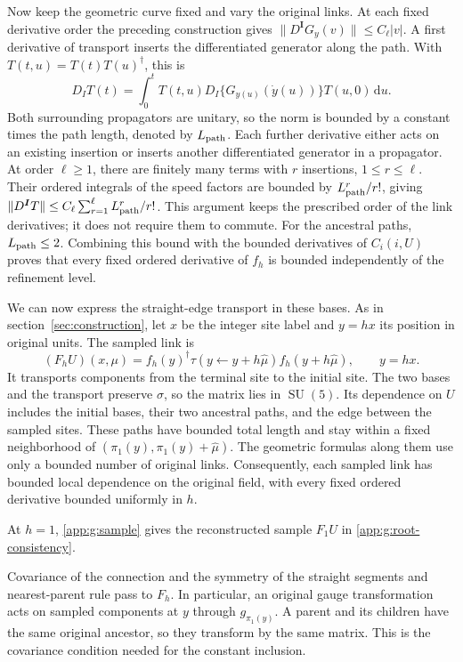 \documentclass[11pt,a4paper]{article}
\theoremstyle{remark}
\DeclareMathOperator{\SU}{SU}
\newcommand{\dd}{\mathrm d}
\begin{document}
Now keep the geometric curve fixed and vary the original links. At each
fixed derivative order the preceding construction gives
$\|D^{\boldsymbol I}G_y(v)\|\le C_\ell|v|$. A first derivative
of transport inserts the differentiated generator along the path. With
$T(t,u)=T(t)T(u)^\dagger$, this is
\begin{equation}
 D_I T(t)=\int_0^t T(t,u)
       D_I\{G_{y(u)}(\dot y(u))\}T(u,0)\,\dd u .
\end{equation}
Both surrounding propagators are unitary, so the norm is bounded by a
constant times the path length, denoted by $L_{\rm path}$. Each further derivative either acts on
an existing insertion or inserts another differentiated generator in a
propagator. At order $\ell\ge1$, there are finitely many terms with
$r$ insertions, $1\le r\le\ell$. Their ordered integrals of
the speed factors are bounded by $L_{\rm path}^r/r!$, giving
$\|D^{\boldsymbol I}T\|\le
C_\ell\sum_{r=1}^{\ell}L_{\rm path}^r/r!$.
This argument keeps the prescribed order of the link derivatives; it
does not require them to commute. For the ancestral paths,
$L_{\rm path}\le2$. Combining this bound with the bounded
derivatives of $C_i(i,U)$ proves that every fixed ordered derivative
of $f_h$ is bounded independently of the refinement level.

We can now express the straight-edge transport in these bases. As in
section~\ref{sec:construction}, let $x$ be the integer site label
and $y=hx$ its position in original units. The sampled link is
\begin{equation}
 (F_hU)(x,\mu)=
 f_h(y)^{\dagger}\tau(y\leftarrow y+h\hat\mu)f_h(y+h\hat\mu),
 \qquad y=hx.
 \label{app:g:sample}
\end{equation}
It transports components from the terminal site to the initial site.
The two bases and the transport preserve $\sigma$, so the matrix
lies in $\SU(5)$. Its dependence on $U$ includes the initial
bases, their two ancestral paths, and the edge between the sampled
sites. These paths have bounded total length and stay within a fixed
neighborhood of $(\pi_1(y),\pi_1(y)+\hat\mu)$. The geometric
formulas along them use only a bounded number of original links.
Consequently, each sampled link has bounded local dependence on the
original field, with every fixed ordered derivative bounded uniformly
in $h$.

At $h=1$, \eqref{app:g:sample} gives the reconstructed sample
$F_1U$ in \eqref{app:g:root-consistency}.

Covariance of the connection and the symmetry of the straight segments
and nearest-parent rule pass to $F_h$. In particular, an original
gauge transformation acts on sampled components at $y$ through
$g_{\pi_1(y)}$. A parent and its children have the same original
ancestor, so they transform by the same matrix. This is the covariance
condition needed for the constant inclusion.
\end{document}
